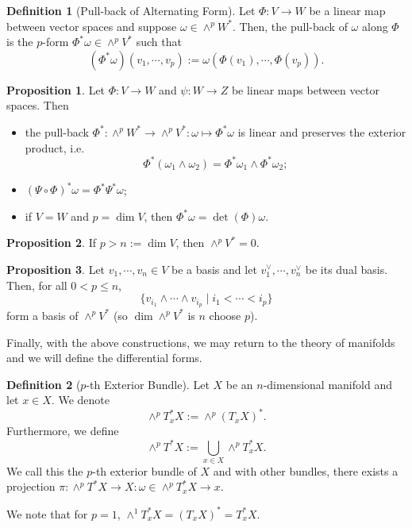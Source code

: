 \documentclass[]{article}
\theoremstyle{definition}
\theoremstyle{definition}
\newtheorem{definition}{Definition}[section]
\newtheorem{proposition}{Proposition}[section]
\begin{document}
\begin{definition}[Pull-back of Alternating Form]
  Let \(\Phi : V \to W\) be a linear map between vector spaces and suppose 
  \(\omega \in \wedge^p W^*\). Then, the pull-back of \(\omega\) along 
  \(\Phi\) is the \(p\)-form \(\Phi^*\omega \in \wedge^p V^*\) such that 
  \[(\Phi^* \omega)(v_1, \cdots, v_p) := \omega(\Phi(v_1), \cdots, \Phi(v_p)).\] 
\end{definition}

\begin{proposition}
  Let \(\Phi : V \to W\) and \(\psi : W \to Z\) be linear maps between vector 
  spaces. Then 
  \begin{itemize}
    \item the pull-back \(\Phi^* : \wedge^p W^* \to \wedge^p V^* : \omega \mapsto \Phi^* \omega\) 
      is linear and preserves the exterior product, i.e. 
      \[\Phi^*(\omega_1 \wedge \omega_2) = \Phi^*\omega_1 \wedge \Phi^* \omega_2;\]
    \item \((\Psi \circ \Phi)^* \omega = \Phi^* \Psi^* \omega\);
    \item if \(V = W\) and \(p = \dim V\), then \(\Phi^* \omega = \det(\Phi) \omega\).
  \end{itemize}
\end{proposition}

\begin{proposition}
  If \(p > n := \dim V\), then \(\wedge^p V^* = 0\). 
\end{proposition}

\begin{proposition}
  Let \(v_1, \cdots, v_n \in V\) be a basis and let \(v_1^\vee, \cdots, v_n^\vee\) 
  be its dual basis. Then, for all \(0 < p \le n\), 
  \[\{v_{i_1} \wedge \cdots \wedge v_{i_p} \mid i_1 < \cdots < i_p\}\]
  form a basis of \(\wedge^p V^*\) (so \(\dim \wedge^p V^*\) is \(n\) choose \(p\)). 
\end{proposition}

Finally, with the above constructions, we may return to the theory of manifolds 
and we will define the differential forms.

\begin{definition}[\(p\)-th Exterior Bundle]
  Let \(X\) be an \(n\)-dimensional manifold and let \(x \in X\). We denote 
  \[\wedge^p T^*_x X := \wedge^p (T_x X)^*.\]
  Furthermore, we define
  \[\wedge^p T^* X := \bigcup_{x \in X} \wedge^p T^*_x X.\]
  We call this the \(p\)-th exterior bundle of \(X\) and with other bundles, 
  there exists a projection \(\pi : \wedge^p T^* X \to X : 
    \omega \in \wedge^p T^*_x X \to x\).
\end{definition}
We note that for \(p = 1\), \(\wedge^1 T^*_x X = (T_x X)^* = T^*_x X\).
\end{document}
